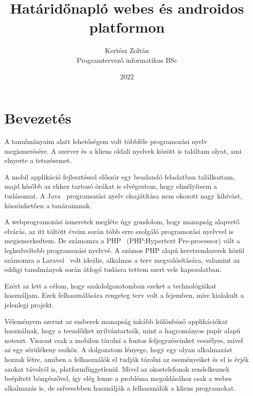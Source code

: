 \documentclass[
]{thesis-ekf}
\theoremstyle{definition}
\theoremstyle{remark}
\begin{document}
	\title{Határidőnapló webes és androidos platformon}
	\author{Kertész Zoltán\\Programtervező informatikus BSc}
	\date{2022}
	\maketitle
	\tableofcontents
	
	\chapter*{Bevezetés}
	A tanulmányaim alatt lehetőségem volt többféle programozási nyelv megismerésére. A szerver és a kliens oldali nyelvek között is találtam olyat, ami elnyerte a tetszésemet. 
	
	A mobil applikáció fejlesztéssel először egy beadandó feladatban találkoztam, majd később az ehhez tartozó órákat is elvégeztem, hogy elmélyítsem a tudásomat. A Java~\cite{java_book} programozási nyelv elsajátítása nem okozott nagy kihívást, köszönhetően a tanáraimnak. 
	
	A webprogramozási ismeretek megléte úgy gondolom, hogy manapság alapvető elvárás, az itt töltött éveim során több erre szolgáló programozási nyelvvel is megismerkedtem. De számomra a PHP~\cite{php_doc} (PHP:Hypertext Pre-processor) vált a legkedveltebb programozási nyelvvé. A számos PHP alapú keretrendszerek közül számomra a Laravel~\cite{laravel_main} volt ideális, alkalmas a terv megvalósítására, valamint az eddigi tanulmányok során átfogó tudásra tettem szert vele kapcsolatban.
	
	Ezért az lett a célom, hogy szakdolgozatomban ezeket a technológiákat használjam. Ezek felhasználására rengeteg terv volt a fejemben, mire kialakult a jelenlegi projekt.
	
	Véleményem szerint az emberek manapság inkább különböző applikációkat használnak, hogy a teendőiket nyilvántartsák, mint a hagyományos papír alapú noteszt. Viszont csak a mobilon tárolni a fontos feljegyzéseinket veszélyes, mivel az egy sérülékeny eszköz. A dolgozatom lényege, hogy egy olyan alkalmazást hozzak létre, amiben a felhasználók el tudják tárolni az eseményeiket és el is érjék azokat távolról is, platformfüggetlenül. Mivel az okostelefonok rendelkeznek beépített böngészővel, így elég lenne a probléma megoldásához csak a webes alkalmazás is, de szívesebben használják a felhasználók a kliens programokat. 
	
\end{document}
